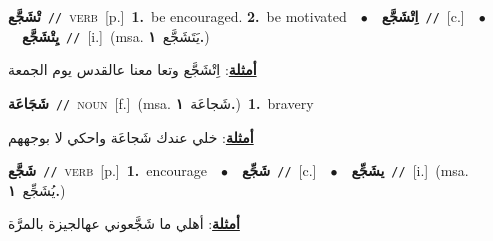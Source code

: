 \documentclass[10pt,a4paper,twoside]{article} %
\begin{document}
\begin{multicols}{2}
{\setlength\topsep{0pt}\textbf{\foreignlanguage{arabic}{تْشَجَّع}}\ {\color{gray}\texttt{//}\color{black}}\ \textsc{verb}\ [p.]\ \textbf{1.}~be encouraged.  \textbf{2.}~be motivated\ \ $\bullet$\ \ \setlength\topsep{0pt}\textbf{\foreignlanguage{arabic}{اِتْشَجَّع}}\ {\color{gray}\texttt{//}\color{black}}\ [c.]\ \ $\bullet$\ \ \setlength\topsep{0pt}\textbf{\foreignlanguage{arabic}{يِتْشَجَّع}}\ {\color{gray}\texttt{//}\color{black}}\ [i.]\ \color{gray}(msa. \foreignlanguage{arabic}{يَتَشَجَّع}~\foreignlanguage{arabic}{\textbf{١.}})\color{black}\  \begin{flushright}\color{gray}\foreignlanguage{arabic}{\textbf{\underline{\foreignlanguage{arabic}{أمثلة}}}: اِتْشَجَّع وتعا معنا عالقدس يوم الجمعة}\end{flushright}\color{black}} \vspace{2mm}

{\setlength\topsep{0pt}\textbf{\foreignlanguage{arabic}{شَجَاعَة}}\ {\color{gray}\texttt{//}\color{black}}\ \textsc{noun}\ [f.]\ \color{gray}(msa. \foreignlanguage{arabic}{شَجاعَة}~\foreignlanguage{arabic}{\textbf{١.}})\color{black}\ \textbf{1.}~bravery\  \begin{flushright}\color{gray}\foreignlanguage{arabic}{\textbf{\underline{\foreignlanguage{arabic}{أمثلة}}}: خلي عندك شَجاعَة واحكي لا بوجههم}\end{flushright}\color{black}} \vspace{2mm}

{\setlength\topsep{0pt}\textbf{\foreignlanguage{arabic}{شَجَّع}}\ {\color{gray}\texttt{//}\color{black}}\ \textsc{verb}\ [p.]\ \textbf{1.}~encourage\ \ $\bullet$\ \ \setlength\topsep{0pt}\textbf{\foreignlanguage{arabic}{شَجِّع}}\ {\color{gray}\texttt{//}\color{black}}\ [c.]\ \ $\bullet$\ \ \setlength\topsep{0pt}\textbf{\foreignlanguage{arabic}{يشَجِّع}}\ {\color{gray}\texttt{//}\color{black}}\ [i.]\ \color{gray}(msa. \foreignlanguage{arabic}{يُشَجِّع}~\foreignlanguage{arabic}{\textbf{١.}})\color{black}\  \begin{flushright}\color{gray}\foreignlanguage{arabic}{\textbf{\underline{\foreignlanguage{arabic}{أمثلة}}}: أهلي ما شَجَّعوني عهالجيزة بالمرَّة}\end{flushright}\color{black}} \vspace{2mm}


\end{multicols}
\end{document}
